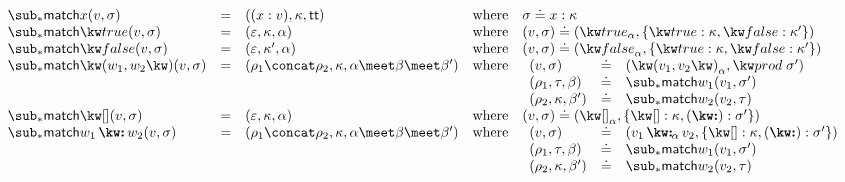 $\begin{array}{lllll}
   \matchFwdF{x}(v, \sigma)
   &=&
   (\bind{x}{v}, \kappa, \TT)
   &\text{where}&
   \sigma \eq \elimVar{x}{\kappa}
   \\
   \matchFwdF{\matchTrueNew}(v, \sigma)
   &=&
   (\seqEmpty, \kappa, \alpha)
   &\text{where}&
   (v, \sigma) \eq (\annTrue{\alpha}, \elimBool{\kappa}{\kappa'})
   \\
   \matchFwdF{\matchFalseNew}(v, \sigma)
   &=&
   (\seqEmpty, \kappa', \alpha)
   &\text{where}&
   (v, \sigma) \eq (\annFalse{\alpha}, \elimBool{\kappa}{\kappa'})
   \\
   \matchFwdF{\matchPair{w_1}{w_2}}(v, \sigma)
   &=&
   (\rho_1 \concat \rho_2, \kappa, \alpha \meet \beta \meet \beta')
   &\text{where}&
   \begin{array}[t]{lll}
      (v, \sigma) &\eq& (\annPair{v_1}{v_2}{\alpha}, \elimProd{\sigma'})
      \\
      (\rho_1, \tau, \beta) &\eq& \matchFwdF{w_1}(v_1,\sigma')
      \\
      (\rho_2, \kappa, \beta') &\eq& \matchFwdF{w_2}(v_2,\tau)
   \end{array}
   \\
   \matchFwdF{\matchNilNew}(v, \sigma)
   &=&
   (\seqEmpty, \kappa, \alpha)
   &\text{where}&
   (v, \sigma) \eq (\annNil{\alpha}, \elimList{\kappa}{\sigma'})
   \\
   \matchFwdF{\matchConsNew{w_1}{w_2}}(v, \sigma)
   &=&
   (\rho_1 \concat \rho_2, \kappa, \alpha \meet \beta \meet \beta')
   &\text{where}&
   \begin{array}[t]{lll}
      (v, \sigma) &\eq& (\annCons{v_1}{v_2}{\alpha}, \elimList{\kappa}{\sigma'})
      \\
      (\rho_1, \tau, \beta) &\eq& \matchFwdF{w_1}(v_1,\sigma')
      \\
      (\rho_2, \kappa, \beta') &\eq& \matchFwdF{w_2}(v_2,\tau)
   \end{array}
\end{array}$\\
